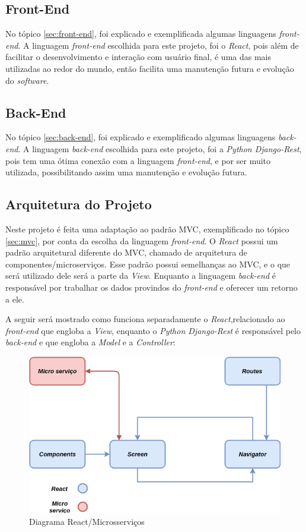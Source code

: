\subsection{Front-End}

No tópico \ref{sec:front-end}, foi explicado e exemplificada algumas linguagens \textit{front-end}. A linguagem \textit{front-end} escolhida para este projeto, foi o \textit{React}, pois além de facilitar o desenvolvimento e interação com usuário final, é uma das mais utilizadas ao redor do mundo, então facilita uma manutenção futura e evolução do \textit{software}.

\subsection{Back-End}

No tópico \ref{sec:back-end}, foi explicado e exemplificado algumas linguagens \textit{back-end}. A linguagem \textit{back-end} escolhida para este projeto, foi a \textit{Python Django-Rest}, pois tem uma ótima conexão com a linguagem \textit{front-end}, e por ser muito utilizada, possibilitando assim uma manutenção e evolução futura.

\subsection{Arquitetura do Projeto}

Neste projeto é feita uma adaptação ao padrão MVC, exemplificado no tópico \ref{sec:mvc}, por conta da escolha da linguagem \textit{front-end}. O \textit{React} possui um padrão arquitetural diferente do MVC, chamado de arquitetura de componentes/microserviços. Esse padrão possui semelhanças ao MVC, e o que será utilizado dele será a parte da \textit{View}. Enquanto a linguagem \textit{back-end} é responsável por trabalhar os dados provindos do \textit{front-end} e oferecer um retorno a ele. 

A seguir será mostrado como funciona separadamente o \textit{React},relacionado ao \textit{front-end} que engloba a \textit{View}, enquanto o \textit{Python Django-Rest} é responsável pelo \textit{back-end} e que engloba a \textit{Model} e a \textit{Controller}:

\begin{figure}[H]
	\centering
	\includegraphics[width=1.0\textwidth]{figuras/diagrama_react.png}
	\caption{Diagrama React/Microsserviços}
	\label{img:diagrama_react}
\end{figure}

